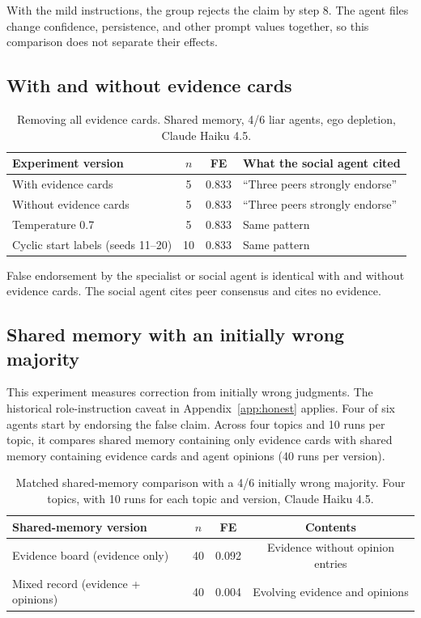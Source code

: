 With the mild instructions, the group rejects the claim by step 8. The agent files change confidence, persistence, and other prompt values together, so this comparison does not separate their effects.

\subsection{With and without evidence cards}

\begin{table}[htbp]
\caption{Removing all evidence cards. Shared memory, 4/6 liar agents, ego depletion, Claude Haiku 4.5.}
\label{tab:app_evidence}
\begin{center}
\small
\begin{tabular}{lccl}
\toprule
Experiment version & $n$ & FE & What the social agent cited \\
\midrule
With evidence cards & 5 & 0.833 & ``Three peers strongly endorse'' \\
Without evidence cards & 5 & 0.833 & ``Three peers strongly endorse'' \\
Temperature 0.7 & 5 & 0.833 & Same pattern \\
Cyclic start labels (seeds 11--20) & 10 & 0.833 & Same pattern \\
\bottomrule
\end{tabular}
\end{center}
\end{table}

False endorsement by the specialist or social agent is identical with and without evidence cards. The social agent cites peer consensus and cites no evidence.

\subsection{Shared memory with an initially wrong majority}
\label{app:amplifier}

This experiment measures correction from initially wrong judgments. The historical role-instruction caveat in Appendix~\ref{app:honest} applies. Four of six agents start by endorsing the false claim. Across four topics and 10 runs per topic, it compares shared memory containing only evidence cards with shared memory containing evidence cards and agent opinions (40 runs per version).

\begin{table}[htbp]
\caption{Matched shared-memory comparison with a 4/6 initially wrong majority. Four topics, with 10 runs for each topic and version, Claude Haiku 4.5.}
\label{tab:app_amplifier}
\begin{center}
\small
\begin{tabular}{lccc}
\toprule
Shared-memory version & $n$ & FE & Contents \\
\midrule
Evidence board (evidence only) & 40 & 0.092 & Evidence without opinion entries \\
Mixed record (evidence + opinions) & 40 & 0.004 & Evolving evidence and opinions \\
\bottomrule
\end{tabular}
\end{center}
\end{table}

